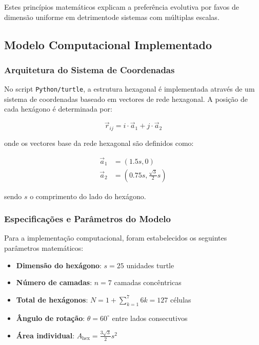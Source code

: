 \documentclass[12pt,a4paper,oneside]{extarticle}
\begin{document}
Estes princípios matemáticos explicam a preferência evolutiva por favos de dimensão uniforme em detrimentode sistemas com múltiplas escalas.

\subsection{Modelo Computacional Implementado}

\subsubsection{Arquitetura do Sistema de Coordenadas}
No script \texttt{Python/turtle}, a estrutura hexagonal é implementada através de um sistema de coordenadas baseado em vectores de rede hexagonal. A posição de cada hexágono é determinada por:

\begin{equation}
\vec{r}_{ij} = i \cdot \vec{a}_1 + j \cdot \vec{a}_2
\label{eq:hexagonal_grid}
\end{equation}

onde os vectores base da rede hexagonal são definidos como:

\begin{align}
\vec{a}_1 &= \left(1.5s, 0\right) \\
\vec{a}_2 &= \left(0.75s, \frac{\sqrt{3}}{2}s\right)
\label{eq:base_vectors}
\end{align}

sendo $s$ o comprimento do lado do hexágono.

\subsubsection{Especificações e Parâmetros do Modelo}
Para a implementação computacional, foram estabelecidos os seguintes parâmetros matemáticos:

\begin{itemize}
    \item \textbf{Dimensão do hexágono}: $s = 25$ unidades turtle
    \item \textbf{Número de camadas}: $n = 7$ camadas concêntricas
    \item \textbf{Total de hexágonos}: $N = 1 + \sum_{k=1}^{7} 6k = 127$ células
    \item \textbf{Ângulo de rotação}: $\theta = 60^\circ$ entre lados consecutivos
    \item \textbf{Área individual}: $A_{\text{hex}} = \frac{3\sqrt{3}}{2}s^2$
\end{itemize}
\end{document}

